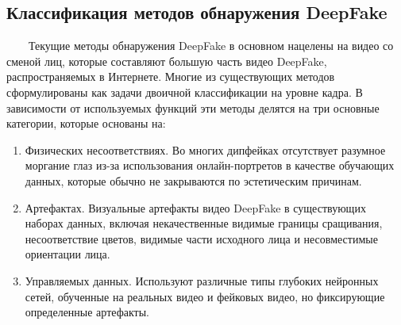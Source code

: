 \documentclass[12pt]{article}
\begin{document}
    \subsection{Классификация методов обнаружения DeepFake}
        $\qquad$Текущие методы обнаружения DeepFake в основном нацелены на видео со сменой лиц, которые составляют большую часть видео DeepFake, распространяемых в Интернете. Многие из существующих методов сформулированы как задачи двоичной классификации на уровне кадра. В зависимости от используемых функций эти методы делятся на три основные категории, которые основаны на:
    \begin{enumerate}
        \item Физических несоответствиях. 
        \newline Во многих дипфейках отсутствует разумное моргание глаз из-за использования онлайн-портретов в качестве обучающих данных, которые обычно не закрываются по эстетическим причинам.
        \item  Артефактах. 
        \newline Визуальные артефакты видео DeepFake в существующих наборах данных, включая некачественные видимые границы сращивания, несоответствие цветов, видимые части исходного лица и несовместимые ориентации лица.
        \item Управляемых данных. 
        \newline Используют различные типы глубоких нейронных сетей, обученные на реальных видео и фейковых видео, но фиксирующие определенные артефакты.
    \end{enumerate}
\end{document}
